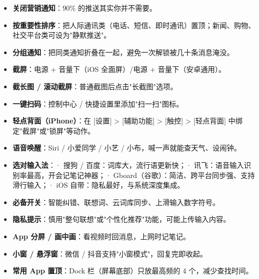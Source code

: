 
\begin{itemize}
  \item \textbf{关闭营销通知}：90\% 的推送其实你并不需要。
  \item \textbf{按重要性排序}：把人际通讯类（电话、短信、即时通讯）置顶；新闻、购物、社交平台类可设为"静默推送"。
  \item \textbf{分组通知}：把同类通知折叠在一起，避免一次解锁被几十条消息淹没。
\end{itemize}


\begin{itemize}
  \item \textbf{截屏}：电源 + 音量下（iOS 全面屏）/电源 + 音量下（安卓通用）。
  \item \textbf{截长图 / 滚动截屏}：普通截图后点击"长截图"选项。
  \item \textbf{一键扫码}：控制中心 / 快捷设置里添加"扫一扫"图标。
  \item \textbf{轻点背面（iPhone）}：在 [设置] > [辅助功能] > [触控] > [轻点背面] 中绑定"截屏"或"锁屏"等动作。
  \item \textbf{语音唤醒}：Siri / 小爱同学 / 小艺 / 小布，喊一声就能查天气、设闹钟。
\end{itemize}


\begin{itemize}
  \item \textbf{选对输入法}：\newline · 搜狗 / 百度：词库大，流行语更新快；\newline · 讯飞：语音输入识别率最高，开会记笔记神器；\newline · Gboard（谷歌）：简洁、跨平台同步强、支持滑行输入；\newline · iOS 自带：隐私最好，与系统深度集成。
  \item \textbf{必备开关}：智能纠错、联想词、云词库同步、上滑输入数字符号。
  \item \textbf{隐私提示}：慎用"整句联想"或"个性化推荐"功能，可能上传输入内容。
\end{itemize}


\begin{itemize}
  \item \textbf{App 分屏 / 画中画}：看视频时回消息，上网时记笔记。
  \item \textbf{小窗 / 悬浮窗}：微信 / 抖音支持"小窗模式"，回复完即收起。
  \item \textbf{常用 App 置顶}：Dock 栏（屏幕底部）只放最高频的 4 个，减少查找时间。
\end{itemize}

